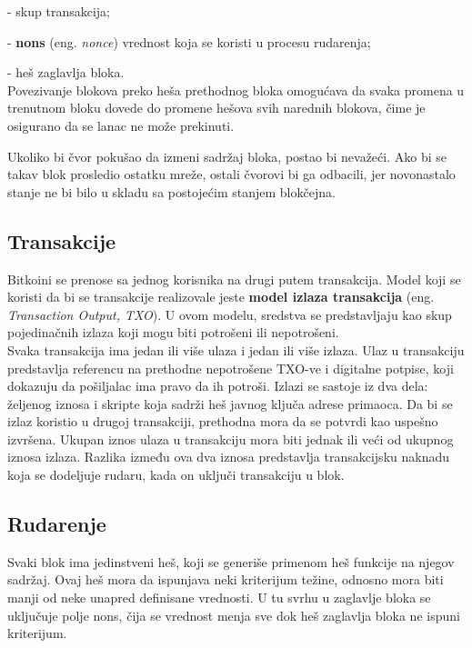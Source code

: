 \documentclass[12pt,a4paper]{article}
\begin{document}
    -	skup transakcija;
    
    -	\textbf{nons} (eng. \textit{nonce}) vrednost koja se koristi u procesu rudarenja;
    
    -	heš zaglavlja bloka.\\

Povezivanje blokova preko heša prethodnog bloka omogućava da svaka promena u trenutnom bloku dovede do promene hešova svih narednih blokova, čime je osigurano da se lanac ne može prekinuti.

Ukoliko bi čvor pokušao da izmeni sadržaj bloka, postao bi nevažeći. Ako bi se takav blok  prosledio ostatku mreže, ostali čvorovi bi ga odbacili, jer novonastalo stanje ne bi bilo u skladu sa postojećim stanjem blokčejna.

\subsection{Transakcije}
Bitkoini se prenose sa jednog korisnika na drugi putem transakcija. Model koji se koristi da bi se transakcije realizovale jeste \textbf{model izlaza transakcija} (eng. \textit{Transaction Output, TXO}). U ovom modelu, sredstva se predstavljaju kao skup pojedinačnih izlaza koji mogu biti potrošeni ili nepotrošeni.\\

Svaka transakcija ima jedan ili više ulaza i jedan ili više izlaza. Ulaz u transakciju predstavlja referencu na prethodne nepotrošene TXO-ve i digitalne potpise, koji dokazuju da pošiljalac ima pravo da ih potroši. Izlazi se sastoje iz dva dela: željenog iznosa i skripte koja sadrži heš javnog ključa adrese primaoca. Da bi se izlaz koristio u drugoj transakciji, prethodna mora da se potvrdi kao uspešno izvršena. Ukupan iznos ulaza u transakciju mora biti jednak ili veći od ukupnog iznosa izlaza. Razlika između ova dva iznosa predstavlja transakcijsku naknadu koja se dodeljuje rudaru, kada on uključi transakciju u blok.

\subsection{Rudarenje}
Svaki blok ima jedinstveni heš, koji se generiše primenom heš funkcije na njegov sadržaj. Ovaj heš mora da ispunjava neki kriterijum težine, odnosno mora biti manji od neke unapred definisane vrednosti. U tu svrhu u zaglavlje bloka se uključuje polje nons, čija se vrednost menja sve dok heš zaglavlja bloka ne ispuni kriterijum. 
\end{document}
